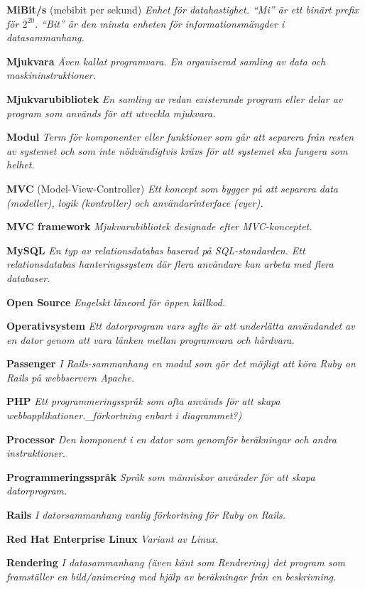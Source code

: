 \documentclass[a4paper, twoside, 11pt, titlepage]{article}
\begin{document}
	\textbf{MiBit/s} (mebibit per sekund) \emph{Enhet för datahastighet. ``Mi'' är ett binärt prefix för $2^20$. ``Bit'' är den minsta enheten för informationsmängder i datasammanhang.}

	\textbf{Mjukvara} \emph{Även kallat programvara. En organiserad samling av data och maskininstruktioner.}

	\textbf{Mjukvarubibliotek} \emph{En samling av redan existerande program eller delar av program som används för att utveckla mjukvara.}

	\textbf{Modul} \emph{Term för komponenter eller funktioner som går att separera från resten av systemet och som inte nödvändigtvis krävs för att systemet ska fungera som helhet.}

	\textbf{MVC} (Model-View-Controller) \emph{Ett koncept som bygger på att separera data (modeller), logik (kontroller) och användarinterface (vyer).}

	\textbf{MVC framework} \emph{Mjukvarubibliotek designade efter MVC-konceptet.}

	\textbf{MySQL} \emph{En typ av relationsdatabas baserad på SQL-standarden. Ett relationsdatabas hanteringssystem där flera användare kan arbeta med flera databaser.}

	\textbf{Open Source} \emph{Engelskt låneord för öppen källkod.}

	\textbf{Operativsystem} \emph{Ett datorprogram vars syfte är att underlätta användandet av en dator genom att vara länken mellan programvara och hårdvara.}

	\textbf{Passenger} \emph{I Rails-sammanhang en modul som gör det möjligt att köra Ruby on Rails på webbservern Apache.}

	\textbf{PHP} \emph{Ett programmeringsspråk som ofta används för att skapa webbapplikationer.\_förkortning enbart i diagrammet?)}

	\textbf{Processor} \emph{Den komponent i en dator som genomför beräkningar och andra instruktioner.}

	\textbf{Programmeringsspråk} \emph{Språk som människor använder för att skapa datorprogram.}

	\textbf{Rails} \emph{I datorsammanhang vanlig förkortning för Ruby on Rails.}

	\textbf{Red Hat Enterprise Linux} \emph{Variant av Linux.}

	\textbf{Rendering} \emph{I datasammanhang (även känt som Rendrering) det program som framställer en bild/animering med hjälp av beräkningar från en beskrivning.}
\end{document}
